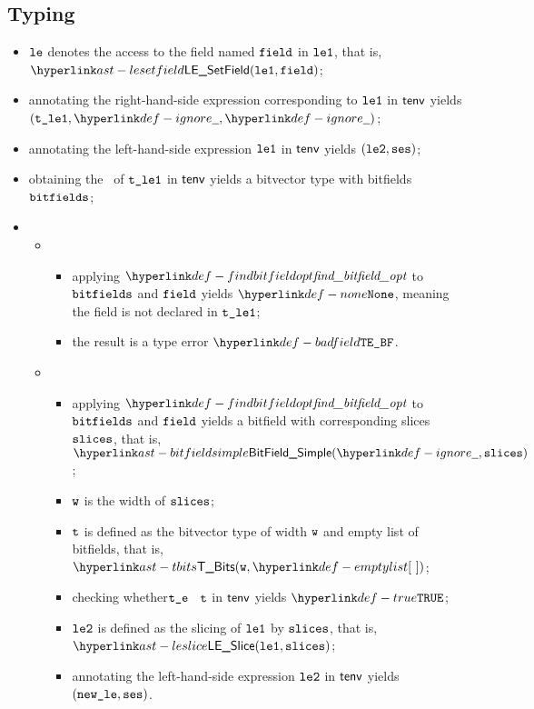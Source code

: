 \subsection{Typing}
\ProseParagraph
\AllApply
\begin{itemize}
  \item $\texttt{le}$ denotes the access to the field named $\texttt{field}$ in $\texttt{le1}$, that is, \\ $\LESetField(\vleone, \field)$;
  \item annotating the right-hand-side expression corresponding to $\texttt{le1}$ in $\textsf{tenv}$ yields \\ $(\vtleone, \Ignore, \Ignore)$\ProseOrTypeError;
  \item annotating the left-hand-side expression $\texttt{le1}$ in $\textsf{tenv}$ yields $(\texttt{le2}, \texttt{ses})$\ProseOrTypeError;
  \item obtaining the \underlyingtype\ of $\texttt{t\_le1}$ in $\textsf{tenv}$ yields a bitvector type with bitfields $\texttt{bitfields}$\ProseOrTypeError;
  \item \OneApplies
  \begin{itemize}
    \item {}
    \begin{itemize}
      \item applying $\findbitfieldopt$ to $\texttt{bitfields}$ and $\texttt{field}$ yields $\None$, meaning the field is not declared
            in $\texttt{t\_le1}$;
      \item the result is a type error $\BadField$.
    \end{itemize}

    \item {}
    \begin{itemize}
      \item applying $\findbitfieldopt$ to $\texttt{bitfields}$ and $\texttt{field}$ yields a bitfield with corresponding slices $\texttt{slices}$,
            that is, $\BitFieldSimple(\Ignore, \slices)$;
      \item $\texttt{w}$ is the width of $\texttt{slices}$;
      \item $\texttt{t}$ is defined as the bitvector type of width $\texttt{w}$ and empty list of bitfields, that is, $\TBits(\vw, \emptylist)$;
      \item checking whether$\texttt{t\_e}$ \typesatisfies\ $\texttt{t}$ in $\textsf{tenv}$ yields $\True$\ProseOrTypeError;
      \item $\texttt{le2}$ is defined as the slicing of $\texttt{le1}$ by $\texttt{slices}$, that is, \\ $\LESlice(\vleone, \slices)$;
      \item annotating the left-hand-side expression $\texttt{le2}$ in $\textsf{tenv}$ yields \\ $(\texttt{new\_le}, \texttt{ses})$\ProseOrTypeError.
    \end{itemize}


\end{itemize}
\end{itemize}
